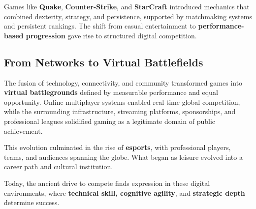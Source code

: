 Games like \textbf{Quake}, \textbf{Counter-Strike}, and \textbf{StarCraft} introduced mechanics that combined dexterity, strategy, and persistence, supported by matchmaking systems and persistent rankings. The shift from casual entertainment to \textbf{performance-based progression} gave rise to structured digital competition.

\subsection{From Networks to Virtual Battlefields}

The fusion of technology, connectivity, and community transformed games into \textbf{virtual battlegrounds} defined by measurable performance and equal opportunity. Online multiplayer systems enabled real-time global competition, while the surrounding infrastructure, streaming platforms, sponsorships, and professional leagues solidified gaming as a legitimate domain of public achievement.

This evolution culminated in the rise of \textbf{esports}, with professional players, teams, and audiences spanning the globe. What began as leisure evolved into a career path and cultural institution.

Today, the ancient drive to compete finds expression in these digital environments, where \textbf{technical skill, cognitive agility}, and \textbf{strategic depth} determine success.